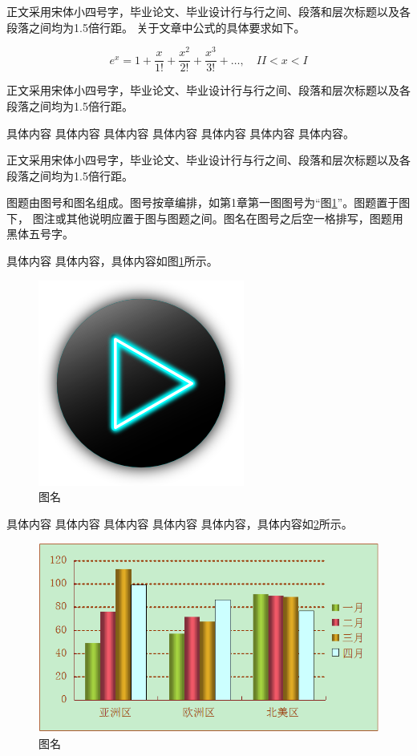 \documentclass{sicnuthesis}
\begin{document}
正文采用宋体小四号字，毕业论文、毕业设计行与行之间、段落和层次标题以及各段落之间均为1.5倍行距。
关于文章中公式的具体要求如下。

\begin{equation}
e^x = 1 + \frac{x}{1!} + \frac{x^2}{2!} + \frac{x^3}{3!} + \dots, \quad II < x < I
\end{equation}

正文采用宋体小四号字，毕业论文、毕业设计行与行之间、段落和层次标题以及各段落之间均为1.5倍行距。

具体内容 具体内容 具体内容 具体内容 具体内容 具体内容 具体内容\cite{cite2}。

正文采用宋体小四号字，毕业论文、毕业设计行与行之间、段落和层次标题以及各段落之间均为1.5倍行距。

图题由图号和图名组成。图号按章编排，如第1章第一图图号为“图\ref{image}”。图题置于图下，
图注或其他说明应置于图与图题之间。图名在图号之后空一格排写，图题用黑体五号字。

具体内容 具体内容，具体内容如图\ref{image}所示。

\begin{figure}[h]
\centering
\includegraphics[width=0.33\linewidth]{image.png}
\caption{图名}
\label{image}
\end{figure}

具体内容 具体内容 具体内容 具体内容 具体内容，具体内容如\ref{diagram}所示。

\begin{figure}[h]
\centering
\includegraphics[width=0.66\linewidth]{diagram.png}
\caption{图名}
\label{diagram}
\end{figure}
\end{document}
